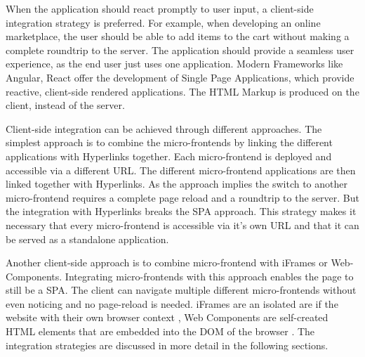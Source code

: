 When the application should react promptly to user input, a client-side integration strategy is preferred. For example, when developing an online marketplace, the user should be able to add items to the cart without making a complete roundtrip to the server. The application should provide a seamless user experience, as the end user just uses one application. Modern Frameworks like Angular, React offer the development of Single Page Applications, which provide reactive, client-side rendered applications. The HTML Markup is produced on the client, instead of the server. \cite{book:2020:geers:background:micro-frontends:micro-frontends-in-action}

Client-side integration can be achieved through different approaches. The simplest approach is to combine the micro-frontends by linking the different applications with Hyperlinks together. Each micro-frontend is deployed and accessible via a different URL. The different micro-frontend applications are then linked together with Hyperlinks. As the approach implies the switch to another micro-frontend requires a complete page reload and a roundtrip to the server. But the integration with Hyperlinks breaks the SPA approach. This strategy makes it necessary that every micro-frontend is accessible via it's own URL and that it can be served as a standalone application.

Another client-side approach is to combine micro-frontend with iFrames or Web-Components. Integrating micro-frontends with this approach enables the page to still be a SPA. The client can navigate multiple different micro-frontends without even noticing and no page-reload is needed. iFrames are an isolated are if the website with their own browser context \cite{book:2020:geers:background:micro-frontends:micro-frontends-in-action}, Web Components are self-created HTML elements that are embedded into the DOM of the browser \cite{book:2019:farrell:background:micro-frontends:web-components-in-action}. The integration strategies are discussed in more detail in the following sections.
